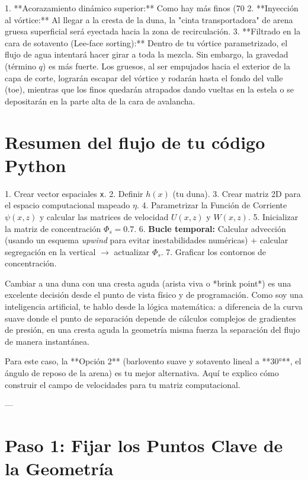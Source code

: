 \documentclass[11pt,a4paper]{article}
\begin{document}
1.  **Acorazamiento dinámico superior:** Como hay más finos (70%
2.  **Inyección al vórtice:** Al llegar a la cresta de la duna, la "cinta transportadora" de arena gruesa superficial será eyectada hacia la zona de recirculación.
3.  **Filtrado en la cara de sotavento (Lee-face sorting):** Dentro de tu vórtice parametrizado, el flujo de agua intentará hacer girar a toda la mezcla. Sin embargo, la gravedad (término $q$) es más fuerte. Los gruesos, al ser empujados hacia el exterior de la capa de corte, lograrán escapar del vórtice y rodarán hasta el fondo del valle (toe), mientras que los finos quedarán atrapados dando vueltas en la estela o se depositarán en la parte alta de la cara de avalancha.

\section{Resumen del flujo de tu código Python}
1. Crear vector espaciales \texttt{x}.
2. Definir $h(x)$ (tu duna).
3. Crear matriz 2D para el espacio computacional mapeado $\eta$.
4. Parametrizar la Función de Corriente $\psi(x,z)$ y calcular las matrices de velocidad $U(x,z)$ y $W(x,z)$.
5. Inicializar la matriz de concentración $\Phi_s = 0.7$.
6. \textbf{Bucle temporal:} Calcular advección (usando un esquema \emph{upwind} para evitar inestabilidades numéricas) + calcular segregación en la vertical $\to$ actualizar $\Phi_s$.
7. Graficar los contornos de concentración.

Cambiar a una duna con una cresta aguda (arista viva o *brink point*) es una excelente decisión desde el punto de vista físico y de programación. Como soy una inteligencia artificial, te hablo desde la lógica matemática: a diferencia de la curva suave donde el punto de separación depende de cálculos complejos de gradientes de presión, en una cresta aguda la geometría misma fuerza la separación del flujo de manera instantánea.

Para este caso, la **Opción 2** (barlovento suave y sotavento lineal a **30°**, el ángulo de reposo de la arena) es tu mejor alternativa. Aquí te explico cómo construir el campo de velocidades para tu matriz computacional.

---

\section{Paso 1: Fijar los Puntos Clave de la Geometría}
\end{document}
